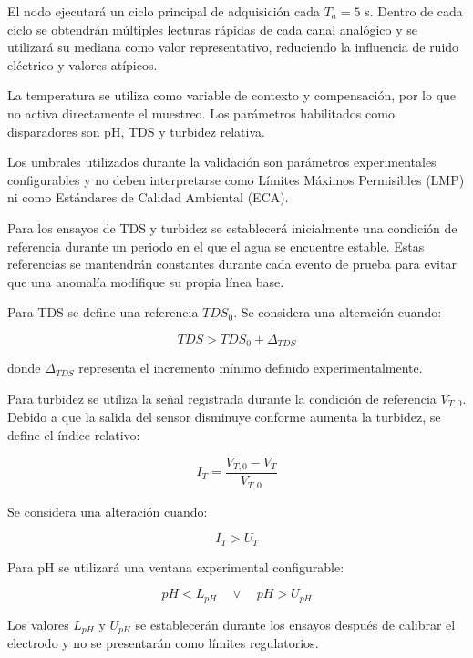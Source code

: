 \documentclass[11pt,a4paper]{article}
\begin{document}
El nodo ejecutará un ciclo principal de adquisición cada $T_a = 5$ s. Dentro de cada ciclo se obtendrán múltiples lecturas rápidas de cada canal analógico y se utilizará su mediana como valor representativo, reduciendo la influencia de ruido eléctrico y valores atípicos.

La temperatura se utiliza como variable de contexto y compensación, por lo que no activa directamente el muestreo. Los parámetros habilitados como disparadores son pH, TDS y turbidez relativa.

Los umbrales utilizados durante la validación son parámetros experimentales configurables y no deben interpretarse como Límites Máximos Permisibles (LMP) ni como Estándares de Calidad Ambiental (ECA).

Para los ensayos de TDS y turbidez se establecerá inicialmente una condición de referencia durante un periodo en el que el agua se encuentre estable. Estas referencias se mantendrán constantes durante cada evento de prueba para evitar que una anomalía modifique su propia línea base.

Para TDS se define una referencia $TDS_0$. Se considera una alteración cuando:

\begin{equation}
    TDS > TDS_0 + \Delta_{TDS}
\end{equation}

donde $\Delta_{TDS}$ representa el incremento mínimo definido experimentalmente.

Para turbidez se utiliza la señal registrada durante la condición de referencia $V_{T,0}$. Debido a que la salida del sensor disminuye conforme aumenta la turbidez, se define el índice relativo:

\begin{equation}
    I_T = \frac{V_{T,0}-V_T}{V_{T,0}}
\end{equation}

Se considera una alteración cuando:

\begin{equation}
    I_T > U_T
\end{equation}

Para pH se utilizará una ventana experimental configurable:

\begin{equation}
    pH < L_{pH}
    \quad \lor \quad
    pH > U_{pH}
\end{equation}

Los valores $L_{pH}$ y $U_{pH}$ se establecerán durante los ensayos después de calibrar el electrodo y no se presentarán como límites regulatorios.
\end{document}
